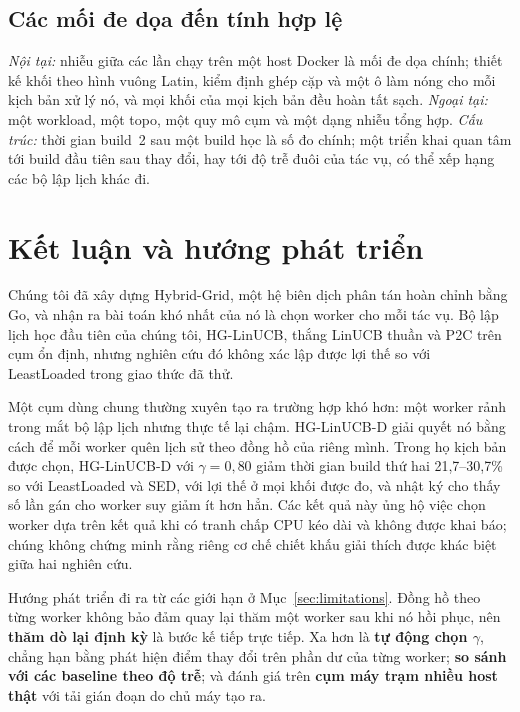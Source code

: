 \documentclass[final,5p,times,twocolumn]{elsarticle}
\begin{document}
\subsection{Các mối đe dọa đến tính hợp lệ}

\emph{Nội tại:} nhiễu giữa các lần chạy trên một host Docker là mối đe dọa chính; thiết kế khối theo hình vuông Latin, kiểm định ghép cặp và một ô làm nóng cho mỗi kịch bản xử lý nó, và mọi khối của mọi kịch bản đều hoàn tất sạch. \emph{Ngoại tại:} một workload, một topo, một quy mô cụm và một dạng nhiễu tổng hợp. \emph{Cấu trúc:} thời gian build~2 sau một build học là số đo chính; một triển khai quan tâm tới build đầu tiên sau thay đổi, hay tới độ trễ đuôi của tác vụ, có thể xếp hạng các bộ lập lịch khác đi.

\section{Kết luận và hướng phát triển}
\label{sec:conclusion}

Chúng tôi đã xây dựng Hybrid-Grid, một hệ biên dịch phân tán hoàn chỉnh bằng Go, và nhận ra bài toán khó nhất của nó là chọn worker cho mỗi tác vụ. Bộ lập lịch học đầu tiên của chúng tôi, HG-LinUCB, thắng LinUCB thuần và P2C trên cụm ổn định, nhưng nghiên cứu đó không xác lập được lợi thế so với LeastLoaded trong giao thức đã thử.

Một cụm dùng chung thường xuyên tạo ra trường hợp khó hơn: một worker rảnh trong mắt bộ lập lịch nhưng thực tế lại chậm. HG-LinUCB-D giải quyết nó bằng cách để mỗi worker quên lịch sử theo đồng hồ của riêng mình. Trong họ kịch bản được chọn, HG-LinUCB-D với $\gamma=0{,}80$ giảm thời gian build thứ hai 21,7--30,7\% so với LeastLoaded và SED, với lợi thế ở mọi khối được đo, và nhật ký cho thấy số lần gán cho worker suy giảm ít hơn hẳn. Các kết quả này ủng hộ việc chọn worker dựa trên kết quả khi có tranh chấp CPU kéo dài và không được khai báo; chúng không chứng minh rằng riêng cơ chế chiết khấu giải thích được khác biệt giữa hai nghiên cứu.

Hướng phát triển đi ra từ các giới hạn ở Mục~\ref{sec:limitations}. Đồng hồ theo từng worker không bảo đảm quay lại thăm một worker sau khi nó hồi phục, nên \textbf{thăm dò lại định kỳ} là bước kế tiếp trực tiếp. Xa hơn là \textbf{tự động chọn $\gamma$}, chẳng hạn bằng phát hiện điểm thay đổi trên phần dư của từng worker; \textbf{so sánh với các baseline theo độ trễ}; và đánh giá trên \textbf{cụm máy trạm nhiều host thật} với tải gián đoạn do chủ máy tạo ra.
\end{document}
